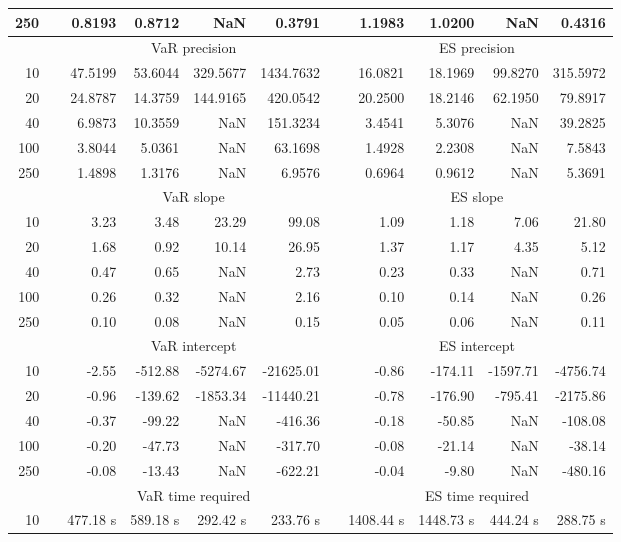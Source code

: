 {\begin{table}[h]
\begin{tabular}{rr rrrr r rrrr}
250 && 0.8193  & 0.8712  &    NaN & 0.3791 && 1.1983  & 1.0200  &    NaN & 0.4316 \\ 
\hline 
 & & \multicolumn{4}{c}{VaR precision} &&  \multicolumn{4}{c}{ES precision} \\ \cline{3-6}  \cline{8-11}
10 && 47.5199  & 53.6044  & 329.5677 & 1434.7632 & & 16.0821  & 18.1969  & 99.8270 & 315.5972 \\ 
20 && 24.8787  & 14.3759  & 144.9165 & 420.0542 & & 20.2500  & 18.2146  & 62.1950 & 79.8917 \\ 
40 && 6.9873  & 10.3559  &    NaN & 151.3234 & & 3.4541  & 5.3076  &    NaN & 39.2825 \\ 
100 && 3.8044  & 5.0361  &    NaN & 63.1698 & & 1.4928  & 2.2308  &    NaN & 7.5843 \\ 
250 && 1.4898  & 1.3176  &    NaN & 6.9576 & & 0.6964  & 0.9612  &    NaN & 5.3691 \\ 
\hline 
 & & \multicolumn{4}{c}{ VaR slope} &&  \multicolumn{4}{c}{ES slope} \\ \cline{3-6}  \cline{8-11}
10 && 3.23  & 3.48  & 23.29 & 99.08 && 1.09  & 1.18  & 7.06 & 21.80 \\ 
20 && 1.68  & 0.92  & 10.14 & 26.95 && 1.37  & 1.17  & 4.35 & 5.12 \\ 
40 && 0.47  & 0.65  &  NaN & 2.73 && 0.23  & 0.33  &  NaN & 0.71 \\ 
100 && 0.26  & 0.32  &  NaN & 2.16 && 0.10  & 0.14  &  NaN & 0.26 \\ 
250 && 0.10  & 0.08  &  NaN & 0.15 && 0.05  & 0.06  &  NaN & 0.11 \\ 
\hline 
 & & \multicolumn{4}{c}{ VaR intercept} &&  \multicolumn{4}{c}{ES intercept} \\ \cline{3-6}  \cline{8-11}
10 && -2.55  & -512.88  & -5274.67 & -21625.01 && -0.86  & -174.11  & -1597.71 & -4756.74 \\ 
20 && -0.96  & -139.62  & -1853.34 & -11440.21 && -0.78  & -176.90  & -795.41 & -2175.86 \\ 
40 && -0.37  & -99.22  &  NaN & -416.36 && -0.18  & -50.85  &  NaN & -108.08 \\ 
100 && -0.20  & -47.73  &  NaN & -317.70 && -0.08  & -21.14  &  NaN & -38.14 \\ 
250 && -0.08  & -13.43  &  NaN & -622.21 && -0.04  & -9.80  &  NaN & -480.16 \\ 
\hline 
 & & \multicolumn{4}{c}{VaR time required} && \multicolumn{4}{c}{ES time required} \\ \cline{3-6}  \cline{8-11}
10 & & 477.18 s & 589.18 s & 292.42 s & 233.76 s && 1408.44 s & 1448.73 s & 444.24 s & 288.75 s \\ 

\end{tabular}
\end{table}}
